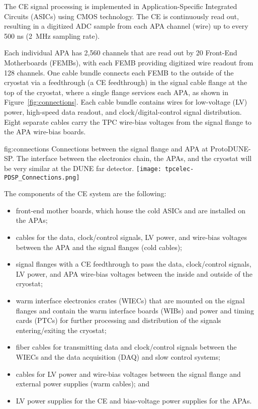 
The CE signal processing is implemented in Application-Specific Integrated Circuits (ASICs)
using CMOS technology.  The CE is continuously read out, resulting in a digitized ADC
sample from each APA channel (wire) up to every 500 ns (2~MHz sampling rate).

Each individual APA has 2,560 channels that are read out by 20 Front-End Motherboards (FEMBs), with
each FEMB providing digitized wire readout from 128 channels.  One cable bundle connects each FEMB to
the outside of the cryostat via a feedthrough (a CE feedthrough) in the signal cable flange at the
top of the cryostat, where a single flange services each APA, as shown in Figure~\ref{fig:connections}.
Each cable bundle contains wires for low-voltage (LV) power, high-speed data readout, and
clock/digital-control signal distribution.  Eight separate cables carry the TPC wire-bias voltages
from the signal flange to the APA wire-bias boards.

\begin{dunefigure}
{fig:connections}
{Connections between the signal flange and APA at ProtoDUNE-SP.  The interface between the electronics chain, the APAs, and the cryostat will be very similar at the DUNE far detector.}
\texttt{[image: tpcelec-PDSP\_Connections.png]}
\end{dunefigure}

The components of the CE system are the following:
\begin{itemize}
\item{front-end mother boards, which house the cold ASICs and are installed on the
APAs;}
\item{cables for the data, clock/control signals, LV power, and wire-bias voltages between the APA and the signal flanges (cold cables);}
\item{signal flanges with a CE feedthrough to pass the data, clock/control signals, LV power, and APA wire-bias voltages between the inside and outside of the cryostat;}
\item{warm interface electronics crates (WIECs) that are mounted on the signal flanges and contain
the warm interface boards (WIBs) and power and timing cards (PTCs) for further processing
and distribution of the signals entering/exiting the cryostat;}
\item{fiber cables for transmitting data and clock/control signals between the WIECs and the
data acquisition (DAQ) and slow control systems;}
\item{cables for LV power and wire-bias voltages between the signal flange and external power
supplies (warm cables); and}
\item{LV power supplies for the CE and bias-voltage power supplies for the APAs.}
\end{itemize}

